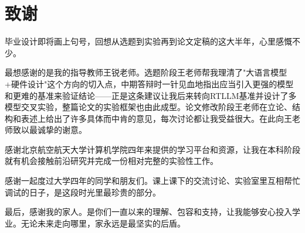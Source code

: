 \chapter*{致谢}

毕业设计即将画上句号，回想从选题到实验再到论文定稿的这大半年，心里感慨不少。

最想感谢的是我的指导教师王锐老师。选题阶段王老师帮我理清了"大语言模型+硬件设计"这个方向的切入点，中期答辩时一针见血地指出应当引入更强的模型和更难的基准来验证结论——正是这条建议让我后来转向RTLLM基准并设计了多模型交叉实验，整篇论文的实验框架也由此成型。论文修改阶段王老师在立论、结构和表述上给出了许多具体而中肯的意见，每次讨论都让我受益很大。在此向王老师致以最诚挚的谢意。

感谢北京航空航天大学计算机学院四年来提供的学习平台和资源，让我在本科阶段就有机会接触前沿研究并完成一份相对完整的实验性工作。

感谢一起度过大学四年的同学和朋友们。课上课下的交流讨论、实验室里互相帮忙调试的日子，是这段时光里最珍贵的部分。

最后，感谢我的家人。是你们一直以来的理解、包容和支持，让我能够安心投入学业。无论未来走向哪里，家永远是最坚实的后盾。

\cleardoublepage
